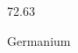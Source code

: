 \documentclass[12pt]{article}
\begin{document}
\hfill{}
\vfill
\begin{center}
  {\fontsize{50}{60}
  }

  72.63

Germanium
\end{center}
\vfill
\end{document}
